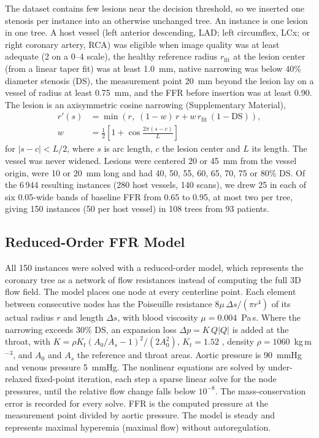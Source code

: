 \documentclass[journal,twoside,web]{ieeecolor}
\begin{document}
The dataset contains few lesions near the decision threshold, so we inserted one stenosis per instance into an
otherwise unchanged tree. An instance is one lesion in one tree. A host vessel (left anterior descending, LAD; left circumflex, LCx; or right coronary artery, RCA) was eligible
when image quality was at least adequate (2 on a 0--4 scale), the healthy reference radius $r_\mathrm{fit}$ at the
lesion center (from a linear taper fit) was at least 1.0~mm, native narrowing was below 40\% diameter stenosis (DS),
the measurement point 20~mm beyond the lesion lay on a vessel of radius at least 0.75~mm, and the FFR before
insertion was at least 0.90. The lesion is an axisymmetric cosine narrowing (Supplementary Material),
\begin{equation}
\begin{aligned}
r'(s) &= \min\!\left(r,\; (1-w)\,r + w\,r_\mathrm{fit}\,(1-\mathrm{DS})\right),\\
w &= \tfrac{1}{2}\left[1+\cos\tfrac{2\pi (s-c)}{L}\right]
\end{aligned}
\end{equation}
for $|s-c|<L/2$, where $s$ is arc length, $c$ the lesion center and $L$ its length. The vessel was never widened.
Lesions were centered 20 or 45~mm from the vessel origin, were 10 or 20~mm long and had 40, 50, 55, 60, 65, 70, 75
or 80\% DS. Of the 6\,944 resulting instances (280 host vessels, 140 scans), we drew 25 in each of six 0.05-wide bands of
baseline FFR from 0.65 to 0.95, at most two per tree, giving 150 instances (50 per host vessel) in 108 trees from 93
patients.

\subsection{Reduced-Order FFR Model}
All 150 instances were solved with a reduced-order model, which represents the coronary tree as a network of flow
resistances instead of computing the full 3D flow field. The model places one node at every centerline point. Each element between consecutive nodes has the Poiseuille
resistance $8\mu\,\Delta s/(\pi r^4)$ of its actual radius $r$ and length $\Delta s$, with blood viscosity
$\mu = 0.004$~Pa\,s. Where the narrowing exceeds 30\% DS, an expansion loss $\Delta p = K\,Q|Q|$ is added at the
throat, with $K = \rho K_t (A_0/A_s - 1)^2 / (2A_0^2)$, $K_t = 1.52$ \cite{young1973}, density
$\rho = 1060$~kg\,m$^{-3}$, and $A_0$ and $A_s$ the reference and throat areas. Aortic pressure is 90~mmHg and
venous pressure 5~mmHg. The nonlinear equations are solved by under-relaxed fixed-point iteration, each step a sparse linear
solve for the node pressures, until the relative flow change falls below $10^{-8}$. The mass-conservation error is recorded for every solve. FFR is the computed
pressure at the measurement point divided by aortic pressure. The model is steady and represents maximal hyperemia
(maximal flow) without autoregulation.
\end{document}
